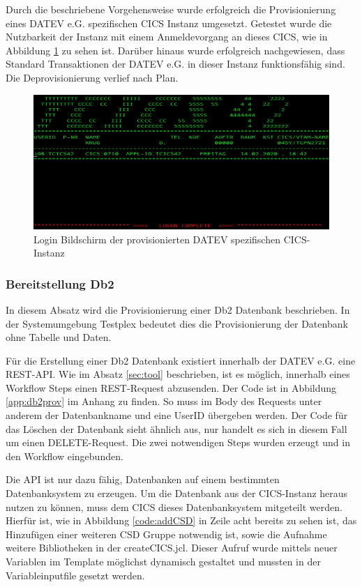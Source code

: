 Durch die beschriebene Vorgehensweise wurde erfolgreich die Provisionierung eines DATEV e.G. spezifischen CICS Instanz umgesetzt.
Getestet wurde die Nutzbarkeit der Instanz mit einem Anmeldevorgang an dieses CICS, wie in Abbildung \ref{fig:cicslogin} zu sehen ist.
Darüber hinaus wurde erfolgreich nachgewiesen, dass Standard Transaktionen der DATEV e.G.  in dieser Instanz funktionsfähig sind.
Die Deprovisionierung verlief nach Plan.

\begin{figure}[h]
	\centering
	\includegraphics[width=\textwidth]{figures/logonscreen.PNG}
	\caption{Login Bildschirm der provisionierten DATEV spezifischen CICS-Instanz}
	\label{fig:cicslogin}
\end{figure}

\subsubsection{Bereitstellung Db2}\label{sssec:db2tpl}
In diesem Absatz wird die Provisionierung einer Db2 Datenbank beschrieben.
In der Systemumgebung Testplex bedeutet dies die Provisionierung der Datenbank ohne Tabelle und Daten.

Für die Erstellung einer Db2 Datenbank existiert innerhalb der DATEV e.G. eine REST-API.
Wie im Absatz \ref{sec:tool} beschrieben, ist es möglich, innerhalb eines Workflow Steps einen REST-Request abzusenden.
Der Code ist in Abbildung \ref{app:db2prov} im Anhang zu finden.
So muss im Body des Requests unter anderem der Datenbankname und eine UserID übergeben werden.
Der Code für das Löschen der Datenbank sieht ähnlich aus, nur handelt es sich in diesem Fall um einen DELETE-Request.
Die zwei notwendigen Steps wurden erzeugt und in den Workflow eingebunden.

Die API ist nur dazu fähig, Datenbanken auf einem bestimmten Datenbanksystem zu erzeugen.
Um die Datenbank aus der CICS-Instanz heraus nutzen zu können, muss dem CICS dieses Datenbanksystem mitgeteilt werden.
Hierfür ist, wie in Abbildung \ref{code:addCSD} in Zeile acht bereits zu sehen ist, das Hinzufügen einer weiteren CSD Gruppe notwendig ist, sowie die Aufnahme weitere Bibliotheken in der \glqq createCICS.jcl\grqq.
Dieser Aufruf wurde mittels neuer Variablen im Template möglichst dynamisch gestaltet und mussten in der Variableinputfile gesetzt werden.

